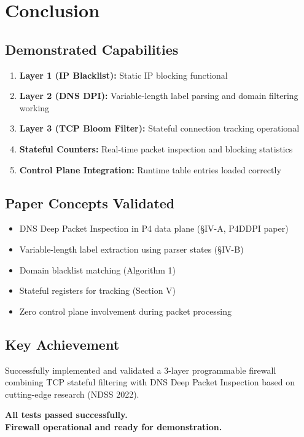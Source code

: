 \documentclass[11pt,a4paper]{article}
\begin{document}
\vspace{2em}

\section*{Conclusion}

\subsection*{Demonstrated Capabilities}
\begin{enumerate}
\item \textbf{Layer 1 (IP Blacklist):} Static IP blocking functional
\item \textbf{Layer 2 (DNS DPI):} Variable-length label parsing and domain filtering working
\item \textbf{Layer 3 (TCP Bloom Filter):} Stateful connection tracking operational
\item \textbf{Stateful Counters:} Real-time packet inspection and blocking statistics
\item \textbf{Control Plane Integration:} Runtime table entries loaded correctly
\end{enumerate}

\subsection*{Paper Concepts Validated}
\begin{itemize}
\item DNS Deep Packet Inspection in P4 data plane (\S IV-A, P4DDPI paper)
\item Variable-length label extraction using parser states (\S IV-B)
\item Domain blacklist matching (Algorithm 1)
\item Stateful registers for tracking (Section V)
\item Zero control plane involvement during packet processing
\end{itemize}

\subsection*{Key Achievement}
Successfully implemented and validated a 3-layer programmable firewall combining TCP stateful filtering with DNS Deep Packet Inspection based on cutting-edge research (NDSS 2022).

\vspace{2em}

\begin{center}
\textbf{All tests passed successfully.}\\
\textbf{Firewall operational and ready for demonstration.}
\end{center}
\end{document}
